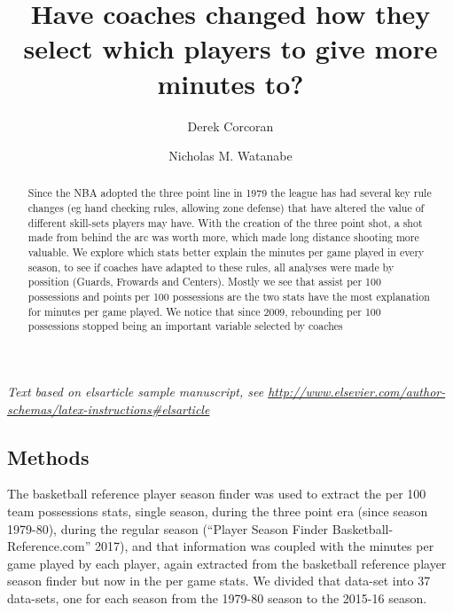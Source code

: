 \documentclass[]{elsarticle} %
\begin{document}
\begin{frontmatter}

  \title{Have coaches changed how they select which players to give more minutes
to?}
    \author[Pontificia Universidad Catolica de Chile]{Derek Corcoran}
    \author[The University of Mississippi]{Nicholas M. Watanabe}
  
      \address[Some Institute of Technology]{Department, Street, City, State, Zip}
    \address[Another University]{Department, Street, City, State, Zip}
  
  \begin{abstract}
  Since the NBA adopted the three point line in 1979 the league has had
  several key rule changes (eg hand checking rules, allowing zone defense)
  that have altered the value of different skill-sets players may have.
  With the creation of the three point shot, a shot made from behind the
  arc was worth more, which made long distance shooting more valuable. We
  explore which stats better explain the minutes per game played in every
  season, to see if coaches have adapted to these rules, all analyses were
  made by possition (Guards, Frowards and Centers). Mostly we see that
  assist per 100 possessions and points per 100 possessions are the two
  stats have the most explanation for minutes per game played. We notice
  that since 2009, rebounding per 100 possessions stopped being an
  important variable selected by coaches
  \end{abstract}
  
 \end{frontmatter}

\emph{Text based on elsarticle sample manuscript, see
\url{http://www.elsevier.com/author-schemas/latex-instructions\#elsarticle}}

\subsection{Methods}\label{methods}

The basketball reference player season finder was used to extract the
per 100 team possessions stats, single season, during the three point
era (since season 1979-80), during the regular season (``Player Season
Finder Basketball-Reference.com'' 2017), and that information was
coupled with the minutes per game played by each player, again extracted
from the basketball reference player season finder but now in the per
game stats. We divided that data-set into 37 data-sets, one for each
season from the 1979-80 season to the 2015-16 season.
\end{document}
